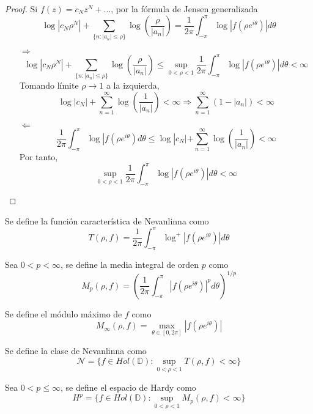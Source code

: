 \begin{proof}
    Si $f(z) = c_Nz^N + \dots$, por la fórmula de Jensen generalizada
    $$\log|c_N\rho^N| + \sum_{\{n : |a_n|\leq\rho\}} \log\left(\frac{\rho}{|a_n|}\right) = \frac{1}{2\pi} \int_{-\pi}^\pi \log|f(\rho e^{i\theta})|d\theta$$
    \begin{itemize}
        \item[$\Rightarrow$] $$\log|c_N\rho^N| + \sum_{\{n : |a_n|\leq\rho\}} \log\left(\frac{\rho}{|a_n|}\right) \leq \sup_{0<\rho<1} \frac{1}{2\pi} \int_{-\pi}^\pi \log|f(\rho e^{i\theta})|d\theta < \infty$$
            Tomando límite $\rho \to 1$ a la izquierda,
            $$\log|c_N| + \sum_{n=1}^\infty \log\left(\frac{1}{|a_n|}\right) < \infty \Rightarrow \sum_{n=1}^\infty (1-|a_n|) < \infty$$
        \item[$\Leftarrow$] $$\frac{1}{2\pi} \int_{-\pi}^\pi \log|f(\rho e^{i\theta})d\theta \leq \log|c_N| + \sum_{n=1}^\infty \log\left(\frac{1}{|a_n|}\right) < \infty$$
            Por tanto,
            $$\sup_{0<\rho<1} \frac{1}{2\pi} \int_{-\pi}^\pi \log|f(\rho e^{i\theta})|d\theta < \infty$$
    \end{itemize}
\end{proof}

\begin{definition}
    Se define la función característica de Nevanlinna como
    $$T(\rho, f) = \frac{1}{2\pi} \int_{-\pi}^\pi \log^+|f(\rho e^{i\theta})|d\theta$$
\end{definition}

\begin{definition}
    Sea $0 < p < \infty$, se define la media integral de orden $p$ como
    $$M_p(\rho, f) = \left(\frac{1}{2\pi} \int_{-\pi}^\pi |f(\rho e^{i\theta})|^pd\theta\right)^{1/p}$$
\end{definition}

\begin{definition}
    Se define el módulo máximo de $f$ como
    $$M_\infty(\rho, f) = \max_{\theta \in [0, 2\pi]} |f(\rho e^{i\theta})|$$
\end{definition}

\begin{definition}
    Se define la clase de Nevanlinna como
    $$\mathcal{N} = \{f \in Hol(\mathbb{D}) : \sup_{0<\rho<1} T(\rho, f) < \infty\}$$
\end{definition}

\begin{definition}
    Sea $0 < p \leq \infty$, se define el espacio de Hardy como
    $$H^p = \{f \in Hol(\mathbb{D}) : \sup_{0<\rho<1} M_p(\rho, f) < \infty\}$$
\end{definition}